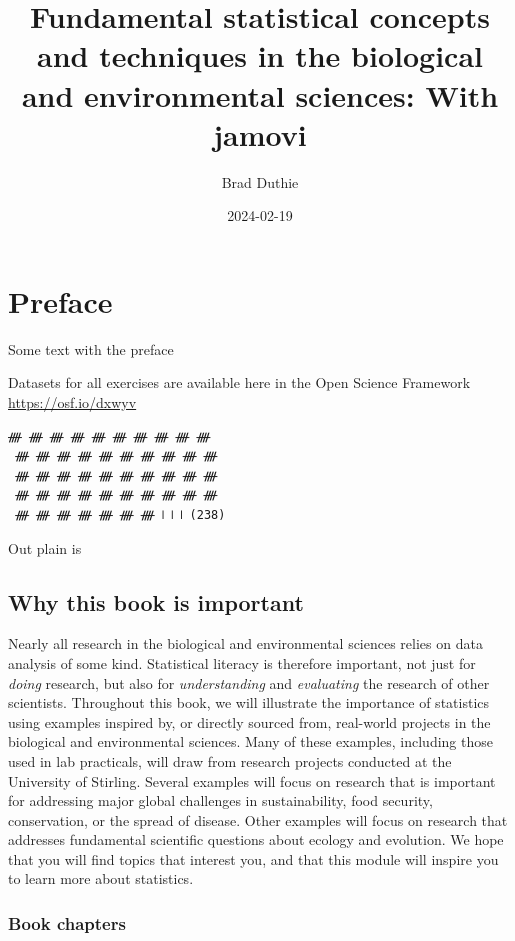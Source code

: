 \documentclass[
]{scrbook}
\title{Fundamental statistical concepts and techniques in the biological and environmental sciences: With jamovi}
\author{Brad Duthie}
\date{2024-02-19}
\begin{document}
\maketitle

{
\hypersetup{linkcolor=}
\setcounter{tocdepth}{1}
\tableofcontents
}
\hypertarget{preface}{%
\chapter*{Preface}\label{preface}}

Some text with the preface

Datasets for all exercises are available here in the Open Science Framework \url{https://osf.io/dxwyv}

\begin{verbatim}
ᚎ ᚎ ᚎ ᚎ ᚎ ᚎ ᚎ ᚎ ᚎ ᚎ 
 ᚎ ᚎ ᚎ ᚎ ᚎ ᚎ ᚎ ᚎ ᚎ ᚎ 
 ᚎ ᚎ ᚎ ᚎ ᚎ ᚎ ᚎ ᚎ ᚎ ᚎ 
 ᚎ ᚎ ᚎ ᚎ ᚎ ᚎ ᚎ ᚎ ᚎ ᚎ 
 ᚎ ᚎ ᚎ ᚎ ᚎ ᚎ ᚎ 𝍩 𝍩 𝍩 (238)
\end{verbatim}

Out plain is \StrokeFive \StrokeFive

\hypertarget{why-this-book-is-important}{%
\section*{Why this book is important}\label{why-this-book-is-important}}

Nearly all research in the biological and environmental sciences relies on data analysis of some kind.
Statistical literacy is therefore important, not just for \emph{doing} research, but also for \emph{understanding} and \emph{evaluating} the research of other scientists.
Throughout this book, we will illustrate the importance of statistics using examples inspired by, or directly sourced from, real-world projects in the biological and environmental sciences.
Many of these examples, including those used in lab practicals, will draw from research projects conducted at the University of Stirling.
Several examples will focus on research that is important for addressing major global challenges in sustainability, food security, conservation, or the spread of disease.
Other examples will focus on research that addresses fundamental scientific questions about ecology and evolution.
We hope that you will find topics that interest you, and that this module will inspire you to learn more about statistics.

\hypertarget{book_chapters}{%
\subsection*{Book chapters}\label{book_chapters}}
\end{document}
